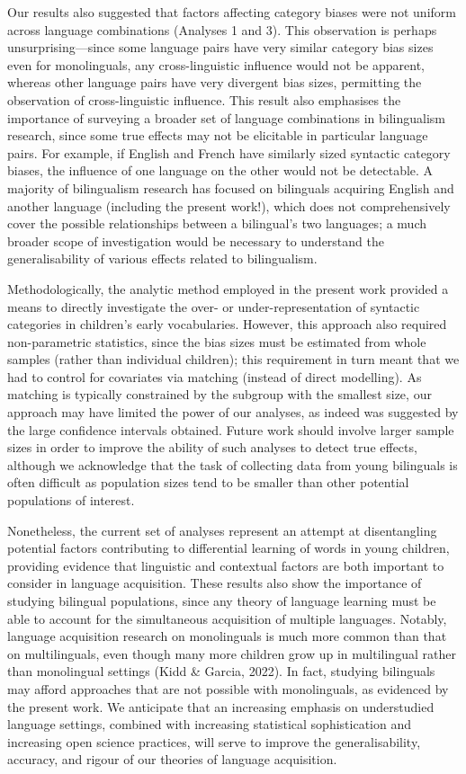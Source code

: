 \documentclass[10pt, letterpaper]{article}
\begin{document}
Our results also suggested that factors affecting category biases were
not uniform across language combinations (Analyses 1 and 3). This
observation is perhaps unsurprising---since some language pairs have
very similar category bias sizes even for monolinguals, any
cross-linguistic influence would not be apparent, whereas other language
pairs have very divergent bias sizes, permitting the observation of
cross-linguistic influence. This result also emphasises the importance
of surveying a broader set of language combinations in bilingualism
research, since some true effects may not be elicitable in particular
language pairs. For example, if English and French have similarly sized
syntactic category biases, the influence of one language on the other
would not be detectable. A majority of bilingualism research has focused
on bilinguals acquiring English and another language (including the
present work!), which does not comprehensively cover the possible
relationships between a bilingual's two languages; a much broader scope
of investigation would be necessary to understand the generalisability
of various effects related to bilingualism.

Methodologically, the analytic method employed in the present work
provided a means to directly investigate the over- or
under-representation of syntactic categories in children's early
vocabularies. However, this approach also required non-parametric
statistics, since the bias sizes must be estimated from whole samples
(rather than individual children); this requirement in turn meant that
we had to control for covariates via matching (instead of direct
modelling). As matching is typically constrained by the subgroup with
the smallest size, our approach may have limited the power of our
analyses, as indeed was suggested by the large confidence intervals
obtained. Future work should involve larger sample sizes in order to
improve the ability of such analyses to detect true effects, although we
acknowledge that the task of collecting data from young bilinguals is
often difficult as population sizes tend to be smaller than other
potential populations of interest.

Nonetheless, the current set of analyses represent an attempt at
disentangling potential factors contributing to differential learning of
words in young children, providing evidence that linguistic and
contextual factors are both important to consider in language
acquisition. These results also show the importance of studying
bilingual populations, since any theory of language learning must be
able to account for the simultaneous acquisition of multiple languages.
Notably, language acquisition research on monolinguals is much more
common than that on multilinguals, even though many more children grow
up in multilingual rather than monolingual settings (Kidd \& Garcia,
2022). In fact, studying bilinguals may afford approaches that are not
possible with monolinguals, as evidenced by the present work. We
anticipate that an increasing emphasis on understudied language
settings, combined with increasing statistical sophistication and
increasing open science practices, will serve to improve the
generalisability, accuracy, and rigour of our theories of language
acquisition.
\end{document}
